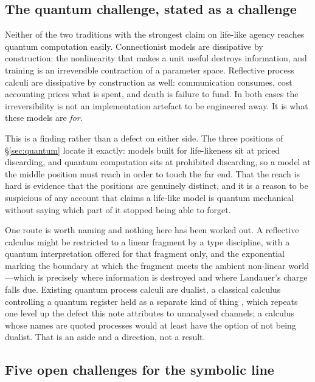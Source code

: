 \documentclass[11pt,a4paper]{article}
\begin{document}
\subsection{The quantum challenge, stated as a challenge}

Neither of the two traditions with the strongest claim on life-like agency
reaches quantum computation easily. Connectionist models are dissipative by
construction: the nonlinearity that makes a unit useful destroys information, and
training is an irreversible contraction of a parameter space. Reflective process
calculi are dissipative by construction as well: communication consumes, cost
accounting prices what is spent, and death is failure to fund. In both cases the
irreversibility is not an implementation artefact to be engineered away. It is
what these models are \emph{for}.

This is a finding rather than a defect on either side. The three positions of
\S\ref{sec:quantum} locate it exactly: models built for life-likeness sit at
priced discarding, and quantum computation sits at prohibited discarding, so a
model at the middle position must reach in order to touch the far end. That the
reach is hard is evidence that the positions are genuinely distinct, and it is a
reason to be suspicious of any account that claims a life-like model is quantum
mechanical without saying which part of it stopped being able to forget.

One route is worth naming and nothing here has been worked out. A reflective
calculus might be restricted to a linear fragment by a type discipline, with a
quantum interpretation offered for that fragment only, and the exponential
marking the boundary at which the fragment meets the ambient non-linear
world---which is precisely where information is destroyed and where Landauer's
charge falls due. Existing quantum process calculi are dualist, a classical
calculus controlling a quantum register held as a separate kind of thing
\cite{gay2005,danos2004}, which repeats one level up the defect this note
attributes to unanalysed channels; a calculus whose names are quoted processes
would at least have the option of not being dualist. That is an aside and a
direction, not a result.

\subsection{Five open challenges for the symbolic line}
\end{document}
